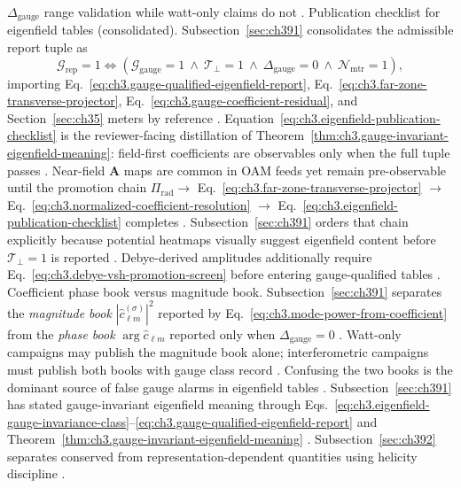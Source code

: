 \(\Delta_{\mathrm{gauge}}\) range validation while watt-only claims do not \cite{hansen1988}.
Publication checklist for eigenfield tables (consolidated). Subsection~\ref{sec:ch391} consolidates the admissible report tuple as
\begin{equation}
\label{eq:ch3.eigenfield-publication-checklist}
\mathcal{G}_{\mathrm{rep}}=1
\iff
\left(
\mathcal{G}_{\mathrm{gauge}}=1\
\wedge\
\mathcal{T}_{\perp}=1\
\wedge\
\Delta_{\mathrm{gauge}}=0\
\wedge\
\mathcal{N}_{\mathrm{mtr}}=1
\right),
\end{equation}
importing Eq.~\eqref{eq:ch3.gauge-qualified-eigenfield-report}, Eq.~\eqref{eq:ch3.far-zone-transverse-projector}, Eq.~\eqref{eq:ch3.gauge-coefficient-residual}, and Section~\ref{sec:ch35} meters by reference
\cite{belinfante1940}. Equation~\eqref{eq:ch3.eigenfield-publication-checklist} is the reviewer-facing distillation of Theorem~\ref{thm:ch3.gauge-invariant-eigenfield-meaning}: field-first coefficients are observables only when the full tuple passes
\cite{poynting1884}.
Near-field \(\mathbf{A}\) maps are common in OAM feeds yet remain pre-observable until the promotion chain \(\Pi_{\mathrm{rad}}\to\) Eq.~\eqref{eq:ch3.far-zone-transverse-projector} \(\to\) Eq.~\eqref{eq:ch3.normalized-coefficient-resolution} \(\to\) Eq.~\eqref{eq:ch3.eigenfield-publication-checklist} completes
\cite{belinfante1940}. Subsection~\ref{sec:ch391} orders that chain explicitly because potential heatmaps visually suggest eigenfield content before \(\mathcal{T}_{\perp}=1\) is reported
\cite{hansen1988}. Debye-derived amplitudes additionally require Eq.~\eqref{eq:ch3.debye-vsh-promotion-screen} before entering gauge-qualified tables
\cite{tai1994}.
Coefficient phase book versus magnitude book. Subsection~\ref{sec:ch391} separates the \emph{magnitude book} \(|\widehat{c}_{\ell m}^{(\sigma)}|^{2}\) reported by Eq.~\eqref{eq:ch3.mode-power-from-coefficient} from the \emph{phase book} \(\arg\widehat{c}_{\ell m}\) reported only when \(\Delta_{\mathrm{gauge}}=0\)
\cite{belinfante1940}. Watt-only campaigns may publish the magnitude book alone; interferometric campaigns must publish both books with gauge class record
\cite{stratton1941}. Confusing the two books is the dominant source of false gauge alarms in eigenfield tables
\cite{harrington2001}.
Subsection~\ref{sec:ch391} has stated gauge-invariant eigenfield meaning through
Eqs.~\eqref{eq:ch3.eigenfield-gauge-invariance-class}--\eqref{eq:ch3.gauge-qualified-eigenfield-report} and
Theorem~\ref{thm:ch3.gauge-invariant-eigenfield-meaning} \cite{belinfante1940}. Subsection~\ref{sec:ch392}
separates conserved from representation-dependent quantities using helicity discipline \cite{stratton1941}.
